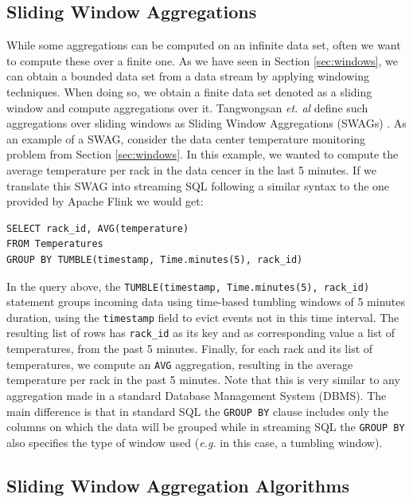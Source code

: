 \subsection{Sliding Window Aggregations}

While some aggregations can be computed on an infinite data set, often we want to compute these over a finite one. As we have seen in Section \ref{sec:windows}, we can obtain a bounded data set from a data stream by applying windowing techniques. When doing so, we obtain a finite data set denoted as a sliding window and compute aggregations over it. Tangwongsan \emph{et. al} define such aggregations over sliding windows as Sliding Window Aggregations (SWAGs) \cite{Tangwongsan-Sliding-Window-Aggregation-Algorithms}. As an example of a SWAG, consider the data center temperature monitoring problem from Section \ref{sec:windows}. In this example, we wanted to compute the average temperature per rack in the data cencer in the last 5 minutes. If we translate this SWAG into streaming SQL following a similar syntax to the one provided by Apache Flink \cite{ApacheFlink} we would get:

\begin{verbatim}
SELECT rack_id, AVG(temperature)
FROM Temperatures
GROUP BY TUMBLE(timestamp, Time.minutes(5), rack_id)
\end{verbatim}

In the query above, the
\texttt{TUMBLE(timestamp, Time.minutes(5), rack\_id)} statement groups incoming data using time-based tumbling windows of 5 minutes duration, using the \texttt{timestamp} field to evict events not in this time interval. The resulting list of rows has \texttt{rack\_id} as its key and as corresponding value a list of temperatures, from the past 5 minutes. Finally, for each rack and its list of temperatures, we compute an \texttt{AVG} aggregation, resulting in the average temperature per rack in the past 5 minutes. Note that this is very similar to any aggregation made in a standard Database Management System (DBMS). The main difference is that in standard SQL the \texttt{GROUP BY} clause includes only the columns on which the data will be grouped while in streaming SQL the \texttt{GROUP BY} also specifies the type of window used (\textit{e.g.} in this case, a tumbling window).


\subsection{Sliding Window Aggregation Algorithms} \label{sec:back-swag-algs}

